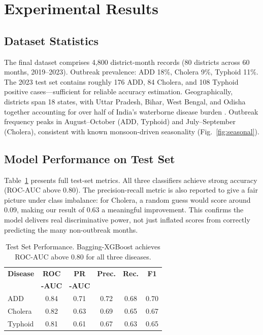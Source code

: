 \documentclass[conference]{IEEEtran}
\begin{document}
\section{Experimental Results}

\subsection{Dataset Statistics}

The final dataset comprises 4,800 district-month records (80 districts
across 60 months, 2019--2023). Outbreak prevalence: ADD 18\%, Cholera
9\%, Typhoid 11\%. The 2023 test set contains roughly 176 ADD, 84
Cholera, and 108 Typhoid positive cases---sufficient for reliable
accuracy estimation. Geographically, districts span 18 states, with
Uttar Pradesh, Bihar, West Bengal, and Odisha together accounting for
over half of India's waterborne disease burden \cite{epiclim2025}.
Outbreak frequency peaks in August--October (ADD, Typhoid) and
July--September (Cholera), consistent with known monsoon-driven
seasonality (Fig.~\ref{fig:seasonal}).

\subsection{Model Performance on Test Set}

Table~\ref{tab:performance} presents full test-set metrics. All three
classifiers achieve strong accuracy (ROC-AUC above 0.80). The
precision-recall metric is also reported to give a fair picture under
class imbalance: for Cholera, a random guess would score around 0.09,
making our result of 0.63 a meaningful improvement. This confirms the
model delivers real discriminative power, not just inflated scores from
correctly predicting the many non-outbreak months.

\begin{table}[!t]
\caption{Test Set Performance. Bagging-XGBoost achieves ROC-AUC above 0.80 for all three diseases.}
\label{tab:performance}
\centering
\renewcommand{\arraystretch}{1.15}
\begin{tabular}{|l|c|c|c|c|c|}
\hline
\textbf{Disease} & \textbf{ROC} & \textbf{PR} & \textbf{Prec.} &
\textbf{Rec.} & \textbf{F1} \\
 & \textbf{-AUC} & \textbf{-AUC} & & & \\
\hline
ADD     & 0.84 & 0.71 & 0.72 & 0.68 & 0.70 \\
Cholera & 0.82 & 0.63 & 0.69 & 0.65 & 0.67 \\
Typhoid & 0.81 & 0.61 & 0.67 & 0.63 & 0.65 \\
\hline
\end{tabular}
\end{table}
\end{document}
